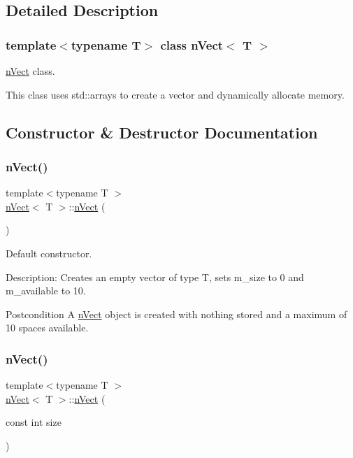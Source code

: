 \subsection{Detailed Description}
\subsubsection*{template$<$typename T$>$\newline
class n\+Vect$<$ T $>$}

\hyperlink{classnVect}{n\+Vect} class. 

This class uses std\+::arrays to create a vector and dynamically allocate memory. 

\subsection{Constructor \& Destructor Documentation}
\mbox{\label{classnVect_abb7dc7935aeb2e8f6811b1f0e4c0fb40}} 
\subsubsection{\texorpdfstring{n\+Vect()}{nVect()}\hspace{0.1cm}{\footnotesize\ttfamily [1/4]}}
{\footnotesize\ttfamily template$<$typename T $>$ \\
\hyperlink{classnVect}{n\+Vect}$<$ T $>$\+::\hyperlink{classnVect}{n\+Vect} (\begin{DoxyParamCaption}{ }\end{DoxyParamCaption})}



Default constructor. 

Description\+: Creates an empty vector of type T, sets m\+\_\+size to 0 and m\+\_\+available to 10. \begin{DoxyPostcond}{Postcondition}
A \hyperlink{classnVect}{n\+Vect} object is created with nothing stored and a maximum of 10 spaces available. 
\end{DoxyPostcond}
\mbox{\label{classnVect_a1b72b4f2c2ca8fadc844936ed6c82d5b}} 
\subsubsection{\texorpdfstring{n\+Vect()}{nVect()}\hspace{0.1cm}{\footnotesize\ttfamily [2/4]}}
{\footnotesize\ttfamily template$<$typename T $>$ \\
\hyperlink{classnVect}{n\+Vect}$<$ T $>$\+::\hyperlink{classnVect}{n\+Vect} (\begin{DoxyParamCaption}\item[{const int}]{size }\end{DoxyParamCaption})}



